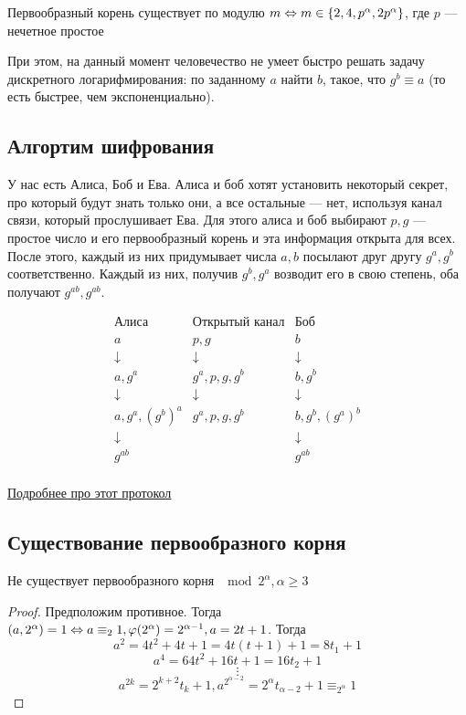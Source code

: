 
\begin{theorem}
    Первообразный корень существует по модулю \(m \Leftrightarrow m \in \{2, 4, p^\alpha, 2p^\alpha\}\), где \(p\) --- нечетное простое
\end{theorem}

При этом, на данный момент человечество не умеет быстро решать задачу дискретного логарифмирования: по заданному \(a\) найти \(b\), такое, что \(g^b \equiv a\) (то есть быстрее, чем экспоненциально).

\subsection{Алгортим шифрования}
У нас есть Алиса, Боб и Ева. Алиса и боб хотят установить некоторый секрет, про который будут знать только они, а все остальные --- нет, используя канал связи, который прослушивает Ева. Для этого алиса и боб выбирают \(p, g\) --- простое число и его первообразный корень и эта информация открыта для всех. После этого, каждый из них придумывает числа \(a, b\) посылают друг другу \(g^a, g^b\) соответственно. Каждый из них, получив \(g^b, g^a\) возводит его в свою степень, оба получают \(g^{ab}, g^{ab}\).

\[\begin{array}{ccc}
    \text{Алиса} & \text{Открытый канал} & \text{Боб} \\
    \hline
    a & p, g & b \\
    \downarrow & \downarrow & \downarrow\\
    a, g^a & g^a, p, g, g^b & b, g^b \\
    \downarrow & \downarrow & \downarrow\\
    a, g^a, (g^b)^a & g^a, p, g, g^b & b, g^b, (g^a)^b \\
    \downarrow &  & \downarrow\\
    g^{ab} & & g^{ab} \\

\end{array}\]

\href{https://ru.wikipedia.org/wiki/Протокол_Диффи_—_Хеллмана}{Подробнее про этот протокол}

\subsection{Существование первообразного корня}
\begin{proposition}
    Не существует первообразного корня \(\mod 2^\alpha, \alpha \ge 3\)
\end{proposition}
\begin{proof}
    Предположим противное. Тогда \((a, 2^\alpha) = 1 \Leftrightarrow a \equiv_2 1, \varphi(2^\alpha) = 2^{\alpha - 1}, a = 2t + 1\). Тогда 
    \[a^2 = 4t^2 + 4t + 1 = 4t(t + 1) + 1 = 8t_1 + 1\]
    \[a^4 = 64t^2 + 16t + 1 = 16t_2 + 1\]
    \[\vdots\]
    \[a^{2k} = 2^{k + 2}t_k + 1, a^{2^{\alpha - 2}} = 2^{\alpha}t_{\alpha - 2} + 1 \equiv_{2^\alpha} 1\]
\end{proof}

